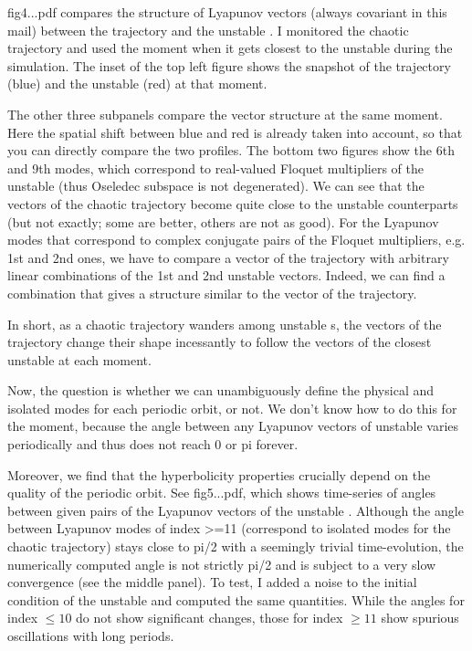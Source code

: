 \begin{description}
fig4...pdf compares the structure of Lyapunov vectors (always covariant
in this mail) between the trajectory and the {unstable \po}. I monitored the
chaotic trajectory and used the moment when it gets closest to the {unstable \po}
during the simulation. The inset of the top left figure shows the
snapshot of the trajectory (blue) and the {unstable \po} (red) at that moment.

The other three subpanels compare the vector structure at the same
moment. Here the spatial shift between blue and red is already taken
into account, so that you can directly compare the two profiles. The
bottom two figures show the 6th and 9th modes, which correspond to
real-valued Floquet multipliers of the {unstable \po} (thus Oseledec subspace is
not degenerated). We can see that the vectors of the chaotic trajectory
become quite close to the {unstable \po} counterparts (but not exactly; some are
better, others are not as good). For the Lyapunov modes that correspond
to complex conjugate pairs of the Floquet multipliers, e.g. 1st and 2nd
ones, we have to compare a vector of the trajectory with arbitrary
linear combinations of the 1st and 2nd {unstable \po} vectors. Indeed, we can find
a combination that gives a structure similar to the vector of the
trajectory.

In short, as a chaotic trajectory wanders among {unstable \po}s, the vectors of the
trajectory change their shape incessantly to follow the vectors of the
closest {unstable \po} at each moment.


Now, the question is whether we can unambiguously define the physical
and isolated modes for each periodic orbit, or not. We don't know how to
do this for the moment, because the angle between any Lyapunov vectors
of {unstable \po} varies periodically and thus does not reach 0 or pi forever.

Moreover, we find that the hyperbolicity properties crucially depend on
the quality of the periodic orbit. See fig5...pdf, which shows
time-series of angles between given pairs of the Lyapunov vectors of the
{unstable \po}. Although the angle between Lyapunov modes of index >=11 (correspond
to isolated modes for the chaotic trajectory) stays close to pi/2 with a
seemingly trivial time-evolution, the numerically computed angle is not
strictly pi/2 and is subject to a very slow convergence (see the middle
panel). To test, I added a noise to the initial condition of the {unstable \po} and
computed the same quantities. While the angles for index $\leq 10$ do not
show significant changes, those for index $\geq 11$ show spurious
oscillations with long periods.


\end{description}
